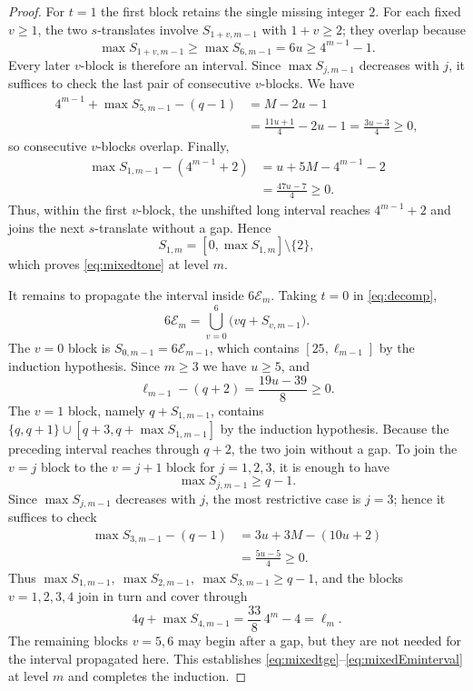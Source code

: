 \documentclass[12pt]{article}
\theoremstyle{plain}
\theoremstyle{definition}
\theoremstyle{plain}
\begin{document}
\begin{proof}
For $t=1$ the first block retains the single missing integer $2$.  For
each fixed $v\geq1$, the two $s$-translates involve $S_{1+v,m-1}$ with
$1+v\geq2$; they overlap because
\[
 \max S_{1+v,m-1}\geq\max S_{6,m-1}=6u\geq4^{m-1}-1.
\]
Every later $v$-block is therefore an interval.  Since $\max S_{j,m-1}$
decreases with $j$, it suffices to check the last pair of consecutive
$v$-blocks.  We have
\[
\begin{aligned}
 4^{m-1}+\max S_{5,m-1}-(q-1)
 &=M-2u-1\\
 &=\frac{11u+1}{4}-2u-1
  =\frac{3u-3}{4}\geq0,
\end{aligned}
\]
so consecutive $v$-blocks overlap.  Finally,
\[
\begin{aligned}
 \max S_{1,m-1}-(4^{m-1}+2)
 &=u+5M-4^{m-1}-2\\
 &=\frac{47u-7}{4}\geq0.
\end{aligned}
\]
Thus, within the first $v$-block, the unshifted long interval reaches
$4^{m-1}+2$ and joins the next $s$-translate without a gap.  Hence
\[
 S_{1,m}=[0,\max S_{1,m}]\setminus\{2\},
\]
which proves \eqref{eq:mixedtone} at level $m$.

It remains to propagate the interval inside $6\mathcal E_{m}$.  Taking
$t=0$ in \eqref{eq:decomp},
\[
 6\mathcal E_{m}=\bigcup_{v=0}^{6}\bigl(vq+S_{v,m-1}\bigr).
\]
The $v=0$ block is $S_{0,m-1}=6\mathcal E_{m-1}$, which contains
$[25,\ell_{m-1}]$ by the induction hypothesis.  Since $m\geq3$ we have
$u\geq5$, and
\[
 \ell_{m-1}-(q+2)=\frac{19u-39}{8}\geq0 .
\]
The $v=1$ block, namely $q+S_{1,m-1}$, contains
$\{q,q+1\}\cup[q+3,q+\max S_{1,m-1}]$ by the induction hypothesis.
Because the preceding interval reaches through $q+2$, the two join
without a gap.  To join the $v=j$ block to the $v=j+1$ block for
$j=1,2,3$, it is enough to have
\[
 \max S_{j,m-1}\geq q-1.
\]
Since $\max S_{j,m-1}$ decreases with $j$, the most restrictive case is
$j=3$; hence it suffices to check
\[
\begin{aligned}
 \max S_{3,m-1}-(q-1)
 &=3u+3M-(10u+2)\\
 &=\frac{5u-5}{4}\geq0 .
\end{aligned}
\]
Thus $\max S_{1,m-1},\ \max S_{2,m-1},\ \max S_{3,m-1}\geq q-1$, and
the blocks $v=1,2,3,4$ join in turn and cover through
\[
 4q+\max S_{4,m-1}=\frac{33}{8}\,4^m-4=\ell_{m} .
\]
The remaining blocks $v=5,6$ may begin after a gap, but they are not
needed for the interval propagated here.  This establishes
\eqref{eq:mixedtge}--\eqref{eq:mixedEminterval} at level $m$ and
completes the induction.
\end{proof}
\end{document}
